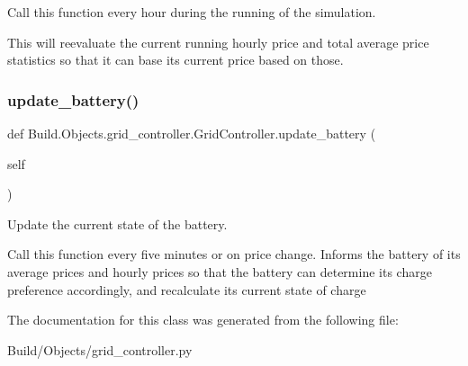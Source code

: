 Call this function every hour during the running of the simulation. 

This will reevaluate the current running hourly price and total average price statistics so that it can base its current price based on those. \mbox{\label{class_build_1_1_objects_1_1grid__controller_1_1_grid_controller_aa6a44013053b81ae9996aa21a44fac1d}} 
\subsubsection{\texorpdfstring{update\+\_\+battery()}{update\_battery()}}
{\footnotesize\ttfamily def Build.\+Objects.\+grid\+\_\+controller.\+Grid\+Controller.\+update\+\_\+battery (\begin{DoxyParamCaption}\item[{}]{self }\end{DoxyParamCaption})}



Update the current state of the battery. 

Call this function every five minutes or on price change. Informs the battery of its average prices and hourly prices so that the battery can determine its charge preference accordingly, and recalculate its current state of charge 

The documentation for this class was generated from the following file\+:\begin{DoxyCompactItemize}
\item 
Build/\+Objects/grid\+\_\+controller.\+py\end{DoxyCompactItemize}
